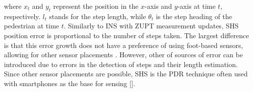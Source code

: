 where $x_{t}$  and  $y_{t}$ represent the position in the $x$-axis and $y$-axis at time  $t$, respectively. $l_{t}$ stands for the step length, while $\theta_{t}$ is the step heading of the pedestrian at time $t$.
Similarly to INS with ZUPT measurement updates, SHS position error is proportional to the number of steps taken. The largest difference is that this error growth does not have a preference of using foot-based sensors, allowing for other sensor placements \cite{Diez2018b}. However, other of sources of error can be introduced due to errors in the detection of steps and their length estimation.  Since other sensor placements are possible, SHS is the PDR technique often used with smartphones as the base for sensing [\qn]. 


